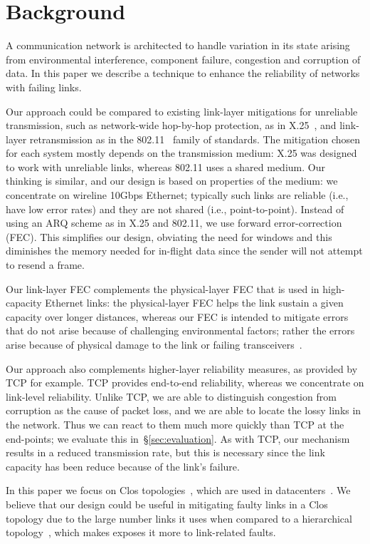 \section{Background}
A communication network is architected to handle variation in its state
arising from environmental interference, component failure, congestion and
corruption of data. In this paper we describe a technique to enhance the
reliability of networks with failing links.

Our approach could be compared to existing link-layer mitigations for
unreliable transmission, such as network-wide hop-by-hop protection, as in
X.25~\cite{X25}, and link-layer retransmission as in the 802.11~\cite{WiFi} family of
standards. The mitigation chosen for each system mostly depends on
the transmission medium: X.25 was designed to work with unreliable links,
whereas 802.11 uses a shared medium. Our thinking is similar,
and our design is based on properties of the medium: we concentrate on wireline
10Gbps Ethernet; typically such links are reliable (i.e., have low error
rates) and they are not shared (i.e., point-to-point).
Instead of using an ARQ scheme as in X.25 and 802.11, we use forward
error-correction (FEC).
This simplifies our design, obviating the need for windows and this
diminishes the memory needed for in-flight data since the sender will
not attempt to resend a frame.

Our link-layer FEC complements the physical-layer FEC that is used in
high-capacity Ethernet links: the physical-layer FEC helps the link sustain a
given capacity over longer distances, whereas our FEC is intended to mitigate
errors that do not arise because of challenging environmental factors; rather
the errors arise because of physical damage to the link or failing transceivers~\cite{Zhuo:2017:UMP:3098822.3098849}.

Our approach also complements higher-layer reliability measures, as provided by
TCP for example.  TCP provides end-to-end reliability, whereas we concentrate
on link-level reliability. Unlike TCP, we are able to distinguish congestion
from corruption as the cause of packet loss, and we are able to locate the
lossy links in the network. Thus we can react to them much more quickly than
TCP at the end-points; we evaluate this in~\S\ref{sec:evaluation}. As with TCP, our mechanism results in a reduced
transmission rate, but this is necessary since the link capacity has been
reduce because of the link's failure.

In this paper we focus on Clos
topologies~\cite{clos_bstj1953}, 
which are used in datacenters~\cite{Singh:2016:JRD:2991470.2975159}.
We believe that our design could be useful in mitigating faulty links in a Clos
topology due to the large number links it uses when compared to a
hierarchical topology~\cite{Al-Fares:2008:SCD:1402946.1402967}, which makes exposes it more to link-related faults.

